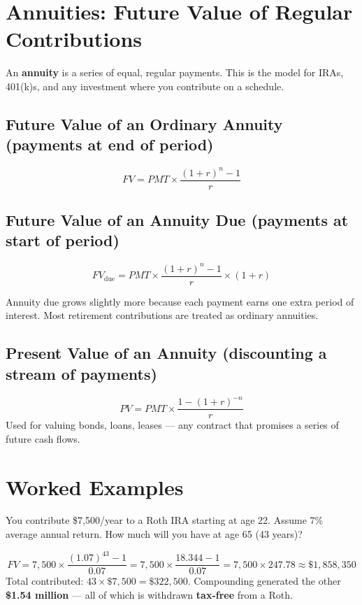\documentclass[11pt, letterpaper]{article}
\begin{document}
\section*{Annuities: Future Value of Regular Contributions}

An \textbf{annuity} is a series of equal, regular payments. This is the model for IRAs, 401(k)s, and any investment where you contribute on a schedule.

\subsection*{Future Value of an Ordinary Annuity (payments at end of period)}
\[
  FV = PMT \times \frac{(1 + r)^n - 1}{r}
\]

\subsection*{Future Value of an Annuity Due (payments at start of period)}
\[
  FV_{\text{due}} = PMT \times \frac{(1 + r)^n - 1}{r} \times (1 + r)
\]

Annuity due grows slightly more because each payment earns one extra period of interest. Most retirement contributions are treated as ordinary annuities.

\subsection*{Present Value of an Annuity (discounting a stream of payments)}
\[
  PV = PMT \times \frac{1 - (1 + r)^{-n}}{r}
\]
Used for valuing bonds, loans, leases --- any contract that promises a series of future cash flows.

\section*{Worked Examples}

\begin{tcolorbox}[colback=part2bg, colframe=sectiongreen,
  title={\bfseries Example A: Roth IRA at Maximum Contribution}, arc=3pt, boxrule=1pt]
You contribute \$7{,}500/year to a Roth IRA starting at age 22. Assume 7\% average annual return. How much will you have at age 65 (43 years)?

\[
  FV = 7{,}500 \times \frac{(1.07)^{43} - 1}{0.07}
     = 7{,}500 \times \frac{18.344 - 1}{0.07}
     = 7{,}500 \times 247.78
     \approx \$1{,}858{,}350
\]
Total contributed: $43 \times \$7{,}500 = \$322{,}500$. Compounding generated the other \textbf{\$1.54 million} --- all of which is withdrawn \textbf{tax-free} from a Roth.
\end{tcolorbox}
\end{document}
